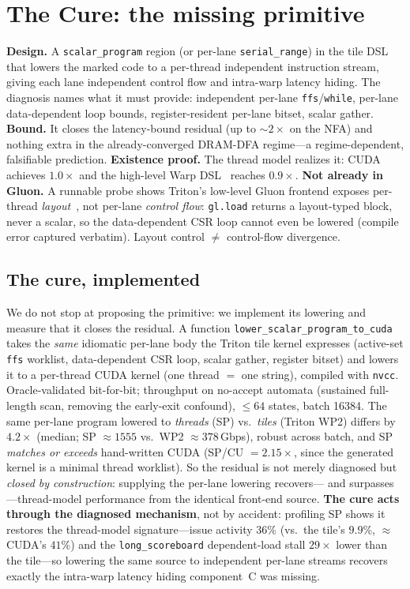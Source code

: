 \documentclass[conference]{IEEEtran}
\begin{document}
\section{The Cure: the missing primitive}\label{sec:cure}
\textbf{Design.} A \texttt{scalar\_program} region (or per-lane \texttt{serial\_range}) in the tile DSL
that lowers the marked code to a per-thread independent instruction stream, giving each lane independent
control flow and intra-warp latency hiding. The diagnosis names what it must provide: independent
per-lane \texttt{ffs}/\texttt{while}, per-lane data-dependent loop bounds, register-resident per-lane
bitset, scalar gather. \textbf{Bound.} It closes the latency-bound residual (up to ${\sim}2\times$ on the
NFA) and nothing extra in the already-converged DRAM-DFA regime---a regime-dependent, falsifiable
prediction. \textbf{Existence proof.} The thread model realizes it: CUDA achieves $1.0\times$ and the
high-level Warp DSL~\cite{warp2022} reaches $0.9\times$. \textbf{Not already in Gluon.} A runnable probe
shows Triton's low-level Gluon frontend exposes per-thread \emph{layout}~\cite{linearlayouts2025}, not
per-lane \emph{control flow}: \texttt{gl.load} returns a layout-typed block, never a scalar, so the
data-dependent CSR loop cannot even be lowered (compile error captured verbatim). Layout control $\ne$
control-flow divergence.

\subsection{The cure, implemented}\label{sec:implemented}
We do not stop at proposing the primitive: we implement its lowering and measure that it closes the
residual. A function \texttt{lower\_scalar\_program\_to\_cuda} takes the \emph{same} idiomatic per-lane
body the Triton tile kernel expresses (active-set \texttt{ffs} worklist, data-dependent CSR loop,
scalar gather, register bitset) and lowers it to a per-thread CUDA kernel (one thread $=$ one string),
compiled with \texttt{nvcc}. Oracle-validated bit-for-bit; throughput on no-accept automata (sustained
full-length scan, removing the early-exit confound), $\le 64$ states, batch 16384. The same per-lane
program lowered to \emph{threads} (SP) vs.\ \emph{tiles} (Triton WP2) differs by \textbf{$4.2\times$}
(median; SP ${\approx}1555$ vs.\ WP2 ${\approx}378$\,Gbps), robust across batch, and SP \emph{matches
or exceeds} hand-written CUDA (SP/CU $= 2.15\times$, since the generated kernel is a minimal thread
worklist). So the residual
is not merely diagnosed but \emph{closed by construction}: supplying the per-lane lowering recovers---
and surpasses---thread-model performance from the identical front-end source.
\textbf{The cure acts through the diagnosed mechanism}, not by accident: profiling SP shows it
restores the thread-model signature---issue activity $36\%$ (vs.\ the tile's $9.9\%$, $\approx$ CUDA's
$41\%$) and the \texttt{long\_scoreboard} dependent-load stall $29\times$ lower than the tile---so
lowering the same source to independent per-lane streams recovers exactly the intra-warp latency
hiding component~C was missing.
\end{document}
